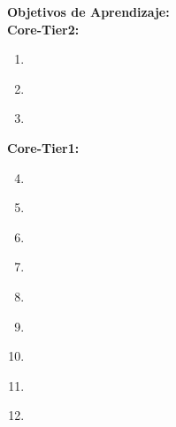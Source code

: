 \noindent \textbf{Objetivos de Aprendizaje:}\\
\noindent \textbf{Core-Tier2:}
\begin{enumerate}
	\setcounter{enumi}{0}
	\item \ALFundamentalDataStructuresandAlgorithmsLODescribeTheAnd\xspace[\ALFundamentalDataStructuresandAlgorithmsLODescribeTheAndLevel]\label{sec:BOK:ALFundamentalDataStructuresandAlgorithmsLODescribeTheAnd}
	\item \ALFundamentalDataStructuresandAlgorithmsLOSolveProblemsAlgorithms\xspace[\ALFundamentalDataStructuresandAlgorithmsLOSolveProblemsAlgorithmsLevel]\label{sec:BOK:ALFundamentalDataStructuresandAlgorithmsLOSolveProblemsAlgorithms}
	\item \ALFundamentalDataStructuresandAlgorithmsLOTrace\xspace[\ALFundamentalDataStructuresandAlgorithmsLOTraceLevel]\label{sec:BOK:ALFundamentalDataStructuresandAlgorithmsLOTrace}
\end{enumerate}
\noindent \textbf{Core-Tier1:}
\begin{enumerate}
	\setcounter{enumi}{3}
	\item \ALFundamentalDataStructuresandAlgorithmsLOImplement\xspace[\ALFundamentalDataStructuresandAlgorithmsLOImplementLevel]\label{sec:BOK:ALFundamentalDataStructuresandAlgorithmsLOImplement}
	\item \ALFundamentalDataStructuresandAlgorithmsLOImplementSimple\xspace[\ALFundamentalDataStructuresandAlgorithmsLOImplementSimpleLevel]\label{sec:BOK:ALFundamentalDataStructuresandAlgorithmsLOImplementSimple}
	\item \ALFundamentalDataStructuresandAlgorithmsLOBe\xspace[\ALFundamentalDataStructuresandAlgorithmsLOBeLevel]\label{sec:BOK:ALFundamentalDataStructuresandAlgorithmsLOBe}
	\item \ALFundamentalDataStructuresandAlgorithmsLODescribeTheHash\xspace[\ALFundamentalDataStructuresandAlgorithmsLODescribeTheHashLevel]\label{sec:BOK:ALFundamentalDataStructuresandAlgorithmsLODescribeTheHash}
	\item \ALFundamentalDataStructuresandAlgorithmsLODiscuss\xspace[\ALFundamentalDataStructuresandAlgorithmsLODiscussLevel]\label{sec:BOK:ALFundamentalDataStructuresandAlgorithmsLODiscuss}
	\item \ALFundamentalDataStructuresandAlgorithmsLODiscussFactors\xspace[\ALFundamentalDataStructuresandAlgorithmsLODiscussFactorsLevel]\label{sec:BOK:ALFundamentalDataStructuresandAlgorithmsLODiscussFactors}
	\item \ALFundamentalDataStructuresandAlgorithmsLOExplainHow\xspace[\ALFundamentalDataStructuresandAlgorithmsLOExplainHowLevel]\label{sec:BOK:ALFundamentalDataStructuresandAlgorithmsLOExplainHow}
	\item \ALFundamentalDataStructuresandAlgorithmsLOSolveProblems\xspace[\ALFundamentalDataStructuresandAlgorithmsLOSolveProblemsLevel]\label{sec:BOK:ALFundamentalDataStructuresandAlgorithmsLOSolveProblems}
	\item \ALFundamentalDataStructuresandAlgorithmsLODemonstrate\xspace[\ALFundamentalDataStructuresandAlgorithmsLODemonstrateLevel]\label{sec:BOK:ALFundamentalDataStructuresandAlgorithmsLODemonstrate}
\end{enumerate}


